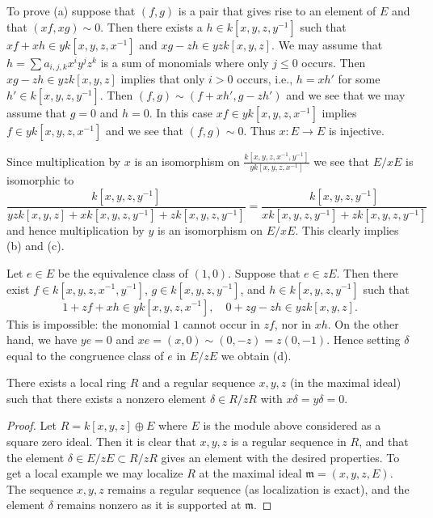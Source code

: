 \medskip\noindent
To prove (a) suppose that $(f, g)$ is a pair that gives rise to an
element of $E$ and that $(xf, xg) \sim 0$. Then there exists a
$h \in k[x, y, z, y^{-1}]$ such that $xf + xh \in yk[x, y, z, x^{-1}]$
and $xg - zh \in yzk[x, y, z]$. We may assume that
$h = \sum a_{i, j, k}x^iy^jz^k$ is a sum of monomials where only
$j \leq 0$ occurs. Then $xg - zh \in yzk[x, y, z]$ implies that
only $i > 0$ occurs, i.e., $h = xh'$ for some $h' \in k[x, y, z, y^{-1}]$.
Then $(f, g) \sim (f + xh', g - zh')$ and we see that we may assume
that $g = 0$ and $h = 0$. In this case $xf \in yk[x, y, z, x^{-1}]$
implies $f \in yk[x, y, z, x^{-1}]$ and we see that $(f, g) \sim 0$.
Thus $x : E \to E$ is injective.

\medskip\noindent
Since multiplication by $x$ is an isomorphism on
$\frac{k[x, y, z, x^{-1}, y^{-1}]}{yk[x, y, z, x^{-1}]}$ we see that
$E/xE$ is isomorphic to
$$
\frac{k[x, y, z, y^{-1}]}{
yzk[x, y, z] + xk[x, y, z, y^{-1}] + zk[x, y, z, y^{-1}]}
=
\frac{k[x, y, z, y^{-1}]}{xk[x, y, z, y^{-1}] + zk[x, y, z, y^{-1}]}
$$
and hence multiplication by $y$ is an isomorphism on $E/xE$. This clearly
implies (b) and (c).

\medskip\noindent
Let $e \in E$ be the equivalence class of $(1, 0)$.
Suppose that $e \in zE$. Then there exist $f \in k[x, y, z, x^{-1}, y^{-1}]$,
$g \in k[x, y, z, y^{-1}]$, and $h \in k[x, y, z, y^{-1}]$ such that
$$
1 + zf + xh \in yk[x, y, z, x^{-1}], \quad
0 + zg - zh \in yzk[x, y, z].
$$
This is impossible: the monomial $1$ cannot occur in
$zf$, nor in $xh$. On the other hand, we have $ye = 0$ and
$xe = (x, 0) \sim (0, -z) = z(0, -1)$. Hence setting $\delta$
equal to the congruence class of $e$ in $E/zE$ we obtain (d).

\begin{lemma}
\label{lemma-strange-regular-sequence}
There exists a local ring $R$ and a regular sequence $x, y, z$
(in the maximal ideal) such that there exists a nonzero element
$\delta \in R/zR$ with $x\delta = y\delta = 0$.
\end{lemma}

\begin{proof}
Let $R = k[x, y, z] \oplus E$ where $E$ is the module above considered
as a square zero ideal. Then it is clear that $x, y, z$ is a regular
sequence in $R$, and that the element $\delta \in E/zE \subset R/zR$
gives an element with the desired properties. To get a local example
we may localize $R$ at the maximal ideal $\mathfrak m = (x, y, z, E)$.
The sequence $x, y, z$ remains a regular sequence (as localization is
exact), and the element $\delta$ remains nonzero as it is supported
at $\mathfrak m$.
\end{proof}

